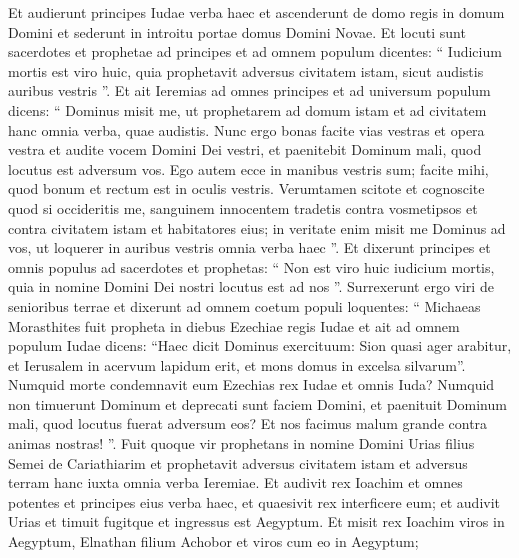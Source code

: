 \begin{biblechapter}
\begin{biblechapter}
\begin{biblechapter}
\begin{biblechapter}
\begin{biblechapter}
\begin{biblechapter}
\begin{biblechapter}
\begin{biblechapter}
\begin{biblechapter}
\begin{biblechapter}
\begin{biblechapter}
\begin{biblechapter}
\begin{biblechapter}
\begin{biblechapter}
\begin{biblechapter}
\begin{biblechapter}
\begin{biblechapter}
\begin{biblechapter}
\begin{biblechapter}
\begin{biblechapter}
\begin{biblechapter}
\begin{biblechapter}
\begin{biblechapter}
\begin{biblechapter}
\begin{biblechapter}
\begin{biblechapter}
\verse Et audierunt principes Iudae verba haec et ascenderunt de domo regis in domum Domini et sederunt in introitu portae domus Domini Novae. 
\verse Et locuti sunt sacerdotes et prophetae ad principes et ad omnem populum dicentes: “ Iudicium mortis est viro huic, quia prophetavit adversus civitatem istam, sicut audistis auribus vestris ”. 
\verse Et ait Ieremias ad omnes principes et ad universum populum dicens: “ Dominus misit me, ut prophetarem ad domum istam et ad civitatem hanc omnia verba, quae audistis. 
\verse Nunc ergo bonas facite vias vestras et opera vestra et audite vocem Domini Dei vestri, et paenitebit Dominum mali, quod locutus est adversum vos. 
\verse Ego autem ecce in manibus vestris sum; facite mihi, quod bonum et rectum est in oculis vestris. 
\verse Verumtamen scitote et cognoscite quod si occideritis me, sanguinem innocentem tradetis contra vosmetipsos et contra civitatem istam et habitatores eius; in veritate enim misit me Dominus ad vos, ut loquerer in auribus vestris omnia verba haec ”. 
 \verse Et dixerunt principes et omnis populus ad sacerdotes et prophetas: “ Non est viro huic iudicium mortis, quia in nomine Domini Dei nostri locutus est ad nos ”.
 \verse Surrexerunt ergo viri de senioribus terrae et dixerunt ad omnem coetum populi loquentes: 
\verse “ Michaeas Morasthites fuit propheta in diebus Ezechiae regis Iudae et ait ad omnem populum Iudae dicens: “Haec dicit Dominus exercituum:
 Sion quasi ager arabitur,
 et Ierusalem in acervum lapidum erit,
 et mons domus in excelsa silvarum”.
 \verse Numquid morte condemnavit eum Ezechias rex Iudae et omnis Iuda? Numquid non timuerunt Dominum et deprecati sunt faciem Domini, et paenituit Dominum mali, quod locutus fuerat adversum eos? Et nos facimus malum grande contra animas nostras! ”.
 \verse Fuit quoque vir prophetans in nomine Domini Urias filius Semei de Cariathiarim et prophetavit adversus civitatem istam et adversus terram hanc iuxta omnia verba Ieremiae. 
\verse Et audivit rex Ioachim et omnes potentes et principes eius verba haec, et quaesivit rex interficere eum; et audivit Urias et timuit fugitque et ingressus est Aegyptum. 
\verse Et misit rex Ioachim viros in Aegyptum, Elnathan filium Achobor et viros cum eo in Aegyptum; 

\end{biblechapter}
\end{biblechapter}
\end{biblechapter}
\end{biblechapter}
\end{biblechapter}
\end{biblechapter}
\end{biblechapter}
\end{biblechapter}
\end{biblechapter}
\end{biblechapter}
\end{biblechapter}
\end{biblechapter}
\end{biblechapter}
\end{biblechapter}
\end{biblechapter}
\end{biblechapter}
\end{biblechapter}
\end{biblechapter}
\end{biblechapter}
\end{biblechapter}
\end{biblechapter}
\end{biblechapter}
\end{biblechapter}
\end{biblechapter}
\end{biblechapter}
\end{biblechapter}
